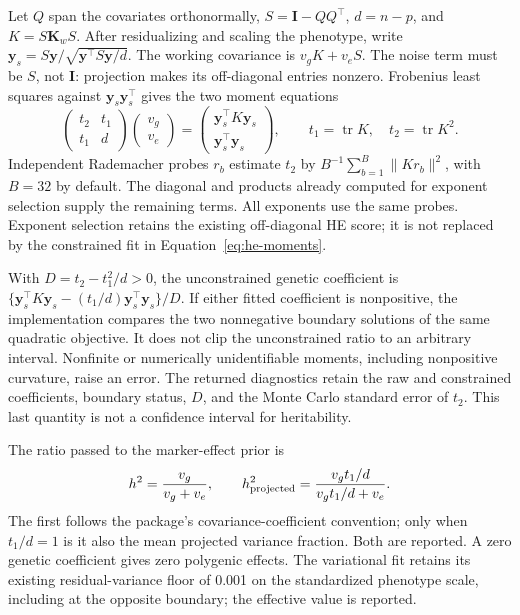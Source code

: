 \documentclass[11pt]{article}
\newcommand{\y}{\mathbf{y}}
\newcommand{\K}{\mathbf{K}}
\newcommand{\I}{\mathbf{I}}
\newcommand{\tr}{\operatorname{tr}}
\begin{document}
Let $Q$ span the covariates orthonormally, $S=\I-QQ^\top$, $d=n-p$,
and $K=S\K_wS$. After residualizing and scaling the phenotype, write
$\y_s=S\y/\sqrt{\y^\top S\y/d}$. The working covariance is
$v_gK+v_eS$. The noise term must be $S$, not $\I$: projection makes
its off-diagonal entries nonzero. Frobenius least squares against
$\y_s\y_s^\top$ gives the two moment equations
\begin{equation}
 \begin{pmatrix}t_2&t_1\\t_1&d\end{pmatrix}
 \begin{pmatrix}v_g\\v_e\end{pmatrix}
 =\begin{pmatrix}\y_s^\top K\y_s\\\y_s^\top\y_s\end{pmatrix},
 \qquad t_1=\tr K,\quad t_2=\tr K^2.
 \label{eq:he-moments}
\end{equation}
Independent Rademacher probes $r_b$ \citep{hutchinson1990} estimate $t_2$ by
$B^{-1}\sum_{b=1}^B\|Kr_b\|^2$, with $B=32$ by default. The diagonal
and products already computed for exponent selection supply the remaining
terms. All exponents use the same probes. Exponent selection retains the
existing off-diagonal HE score; it is not replaced by the constrained
fit in Equation~\eqref{eq:he-moments}.

With $D=t_2-t_1^2/d>0$, the unconstrained genetic coefficient is
$\{\y_s^\top K\y_s-(t_1/d)\y_s^\top\y_s\}/D$.
If either fitted coefficient is nonpositive, the implementation compares the
two nonnegative boundary solutions of the same quadratic objective.
It does not clip the unconstrained ratio to an arbitrary interval.
Nonfinite or numerically unidentifiable moments, including nonpositive
curvature, raise an error. The returned diagnostics retain the raw and
constrained coefficients, boundary status, $D$, and the Monte Carlo
standard error of $t_2$. This last quantity is not a confidence interval
for heritability.

The ratio passed to the marker-effect prior is
\begin{equation}
 h^2=\frac{v_g}{v_g+v_e},\qquad
 h^2_{\rm projected}=\frac{v_g t_1/d}{v_g t_1/d+v_e}.
 \label{eq:he-ratios}
\end{equation}
The first follows the package's covariance-coefficient convention;
only when $t_1/d=1$ is it also the mean projected variance fraction.
Both are reported. A zero genetic coefficient gives zero polygenic
effects. The variational fit retains its existing residual-variance
floor of 0.001 on the standardized phenotype scale, including at the
opposite boundary; the effective value is reported.
\end{document}
